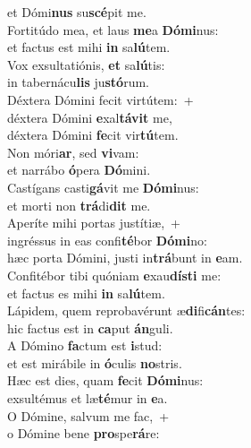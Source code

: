 \oddverse et Dómi\textbf{nus} su\textbf{scé}pit me.\\
\evenverse Fortitúdo mea, et laus \textbf{me}a \textbf{Dó}\textbf{mi}nus:~\*\\
\evenverse et factus est mihi \textbf{in} sa\textbf{lú}tem.\\
\oddverse Vox exsultatiónis, \textbf{et} sa\textbf{lú}tis:~\*\\
\oddverse in tabernácu\textbf{lis} ju\textbf{stó}rum.\\
\evenverse Déxtera Dómini fecit virtútem:~+\\
\evenverse  déxtera Dómini \textbf{e}xal\textbf{tá}\textbf{vit} me,~\*\\
\evenverse déxtera Dómini \textbf{fe}cit vir\textbf{tú}tem.\\
\oddverse Non móri\textbf{ar}, sed \textbf{vi}vam:~\*\\
\oddverse et narrábo \textbf{ó}pera \textbf{Dó}mini.\\
\evenverse Castígans casti\textbf{gá}vit me \textbf{Dó}\textbf{mi}nus:~\*\\
\evenverse et morti non \textbf{trá}di\textbf{dit} me.\\
\oddverse Aperíte mihi portas justítiæ,~+\\
\oddverse  ingréssus in eas confi\textbf{té}bor \textbf{Dó}\textbf{mi}no:~\*\\
\oddverse hæc porta Dómini, justi in\textbf{trá}bunt in \textbf{e}am.\\
\evenverse Confitébor tibi quóniam \textbf{e}xau\textbf{dí}\textbf{sti} me:~\*\\
\evenverse et factus es mihi \textbf{in} sa\textbf{lú}tem.\\
\oddverse Lápidem, quem reprobavérunt æ\textbf{di}fi\textbf{cán}tes:~\*\\
\oddverse hic factus est in \textbf{ca}put \textbf{án}guli.\\
\evenverse A Dómino \textbf{fa}ctum est \textbf{i}stud:~\*\\
\evenverse et est mirábile in \textbf{ó}culis \textbf{no}stris.\\
\oddverse Hæc est dies, quam \textbf{fe}cit \textbf{Dó}\textbf{mi}nus:~\*\\
\oddverse exsultémus et læ\textbf{té}mur in \textbf{e}a.\\
\evenverse O Dómine, salvum me fac,~+\\
\evenverse  o Dómine bene \textbf{pro}spe\textbf{rá}re:~\*\\
